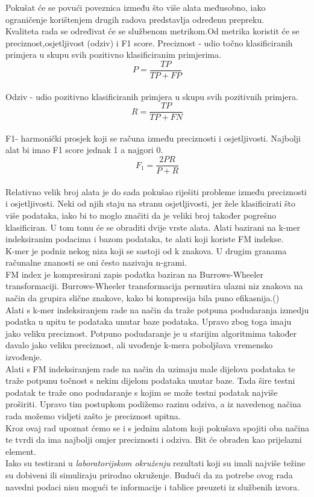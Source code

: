\documentclass[times, utf8, seminar]{fer}
\begin{document}
Pokušat će se povući poveznica između što više alata međusobno, iako ograničenje korištenjem drugih radova predstavlja određenu prepreku.
\\Kvaliteta rada se određivat će se službenom metrikom.Od metrika koristit će se preciznost,osjetljivost (odziv) i F1 score. Preciznost - udio točno klasificiranih primjera u skupu svih pozitivno klasificiranim primjerima.$$P=\dfrac{TP}{TP+FP}$$
\\ Odziv - udio pozitivno klasificiranih primjera u skupu svih pozitivnih primjera. $$R=\dfrac{TP}{TP+FN}$$ 
\\F1- harmonički prosjek koji se računa između preciznosti i osjetljivosti. Najbolji alat bi imao F1 score jednak 1 a najgori 0.
$$F_{1}=\dfrac{2PR}{P+R}$$
\\Relativno velik broj alata je do sada pokušao riješiti probleme između preciznosti i osjetljivosti. Neki od njih staju na stranu osjetljivosti, jer žele klasificirati što više podataka, iako bi to moglo značiti da je veliki broj također pogrešno klasificiran. U tom tonu će se obraditi dvije vrste alata. Alati bazirani na k-mer indeksiranim podacima i bazom podataka, te alati koji koriste FM indekse.
\\K-mer je podniz nekog niza koji se sastoji od k znakova. U drugim granama računalne znanosti se oni često nazivaju n-grami.
\\FM index je kompresirani zapis podatka baziran na Burrows-Wheeler transformaciji. Burrows-Wheeler transformacija permutira ulazni niz znakova na način da grupira slične znakove, kako bi kompresija bila puno efikasnija.(\cite{FM})
\\Alati s k-mer indeksiranjem rade na način da traže potpuna podudaranja izmedju podatka u upitu te podataka unutar baze podataka. Upravo zbog toga imaju jako veliku preciznost. Potpuno podudaranje je u starijim algoritmima također davalo jako veliku preciznost, ali uvođenje k-mera poboljšava vremensko izvođenje.
\\Alati s FM indeksiranjem rade na način da uzimaju male dijelova podataka te traže potpunu točnost s nekim dijelom podataka unutar baze. Tada šire testni podatak te traže ono podudaranje s kojim se može testni podatak najviše proširiti. Upravo tim postupkom podižemo razinu odziva, a iz navedenog načina rada možemo vidjeti zašto je preciznost upitna.
\\Kroz ovaj rad upoznat ćemo se i s jednim alatom koji pokušava spojiti oba načina te tvrdi da ima najbolji omjer preciznosti i odziva. Bit će obrađen kao prijelazni element.
\\Iako su testirani u \textit{laboratorijskom okruženju} rezultati koji su imali najviše težine su dobiveni ili simuliraju prirodno okruženje. Budući da za potrebe ovog rada navedni podaci nisu mogući te informacije i tablice preuzeti iz službenih izvora.
\end{document}
